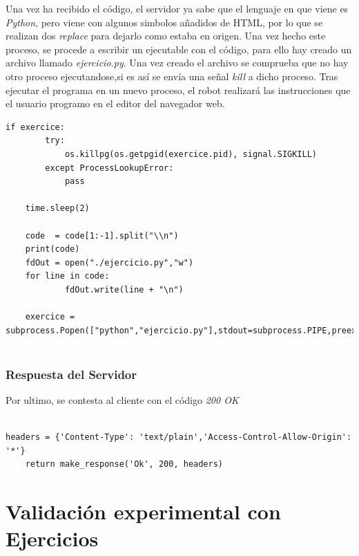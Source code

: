 Una vez ha recibido el código, el servidor ya sabe que el lenguaje en que viene es \textit{Python}, pero viene con algunos simbolos añadidos de HTML, por lo que se realizan dos \textit{replace} para dejarlo como estaba en origen.\newline
Una vez hecho este proceso, se procede a escribir un ejecutable con el código, para ello hay creado un archivo llamado \textit{ejercicio.py}.
Una vez creado el archivo se comprueba que no hay otro proceso ejecutandose,si es así se envía una señal \textit{kill} a dicho proceso.
Tras ejecutar el programa en un nuevo proceso, el robot realizará las instrucciones que el usuario programo en el editor del navegador web.
\\
\begin{lstlisting}[frame=single,breaklines=true, label=Creación del proceso con el programa para el robot, caption=Creación del proceso con el programa para el robot,  captionpos=b]
if exercice:
        try:
            os.killpg(os.getpgid(exercice.pid), signal.SIGKILL)
        except ProcessLookupError:
            pass

    time.sleep(2)
  
    code  = code[1:-1].split("\\n")
    print(code)
    fdOut = open("./ejercicio.py","w")
    for line in code:
            fdOut.write(line + "\n")
    
    exercice = subprocess.Popen(["python","ejercicio.py"],stdout=subprocess.PIPE,preexec_fn=os.setsid)
    
\end{lstlisting}

\subsubsection{Respuesta del Servidor}

Por ultimo, se contesta al cliente con el código \textit{200 OK} 

\begin{lstlisting}[frame=single,breaklines=true, label=Respuesta del Servidor, caption=Creación del proceso con el programa para el robot,  captionpos=b]

headers = {'Content-Type': 'text/plain','Access-Control-Allow-Origin': '*'}
    return make_response('Ok', 200, headers)

\end{lstlisting}



\section{Validación experimental con Ejercicios}

